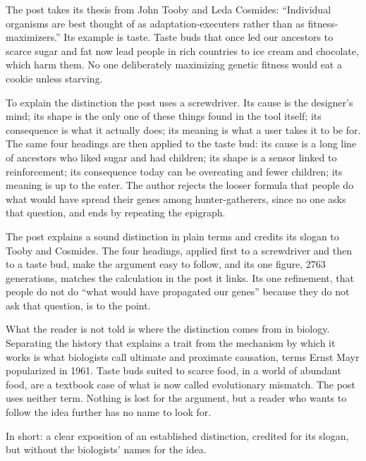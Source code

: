 \begin{afterword}
\summaryhead

The post takes its thesis from John Tooby and Leda Cosmides: ``Individual organisms are best thought of as adaptation-executers rather than as fitness-maximizers.'' Its example is taste. Taste buds that once led our ancestors to scarce sugar and fat now lead people in rich countries to ice cream and chocolate, which harm them. No one deliberately maximizing genetic fitness would eat a cookie unless starving.

To explain the distinction the post uses a screwdriver. Its cause is the designer's mind; its shape is the only one of these things found in the tool itself; its consequence is what it actually does; its meaning is what a user takes it to be for. The same four headings are then applied to the taste bud: its cause is a long line of ancestors who liked sugar and had children; its shape is a sensor linked to reinforcement; its consequence today can be overeating and fewer children; its meaning is up to the eater. The author rejects the looser formula that people do what would have spread their genes among hunter-gatherers, since no one asks that question, and ends by repeating the epigraph.

\responsehead

The post explains a sound distinction in plain terms and credits its slogan to Tooby and Cosmides. The four headings, applied first to a screwdriver and then to a taste bud, make the argument easy to follow, and its one figure, 2763 generations, matches the calculation in the post it links. Its one refinement, that people do not do ``what would have propagated our genes'' because they do not ask that question, is to the point.

What the reader is not told is where the distinction comes from in biology. Separating the history that explains a trait from the mechanism by which it works is what biologists call ultimate and proximate causation, terms Ernst Mayr popularized in 1961. Taste buds suited to scarce food, in a world of abundant food, are a textbook case of what is now called evolutionary mismatch. The post uses neither term. Nothing is lost for the argument, but a reader who wants to follow the idea further has no name to look for.

In short: a clear exposition of an established distinction, credited for its slogan, but without the biologists' names for the idea.
\end{afterword}
